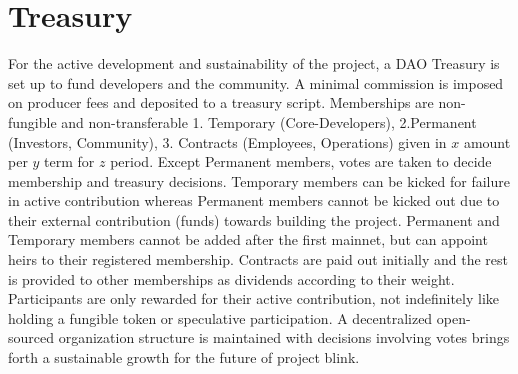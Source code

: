 \documentclass[../Bitcoin Blink.tex]{subfiles}
\begin{document}
\section{Treasury}
For the active development and sustainability of the project, a DAO Treasury is set up to fund developers and the community. A minimal commission is imposed on producer fees and deposited to a treasury script. Memberships are non-fungible and non-transferable 1. Temporary (Core-Developers), 2.Permanent (Investors, Community), 3. Contracts (Employees, Operations) given in $x$ amount per $y$ term for $z$ period. Except Permanent members, votes are taken to decide membership and treasury decisions. Temporary members can be kicked for failure in active contribution whereas Permanent members cannot be kicked out due to their external contribution (funds) towards building the project. Permanent and Temporary members cannot be added after the first mainnet, but can appoint heirs to their registered membership. Contracts are paid out initially and the rest is provided to other memberships as dividends according to their weight. Participants are only rewarded for their active contribution, not indefinitely like holding a fungible token or speculative participation. A decentralized open-sourced organization structure is maintained with decisions involving votes brings forth a sustainable growth for the future of project blink.
\end{document}
